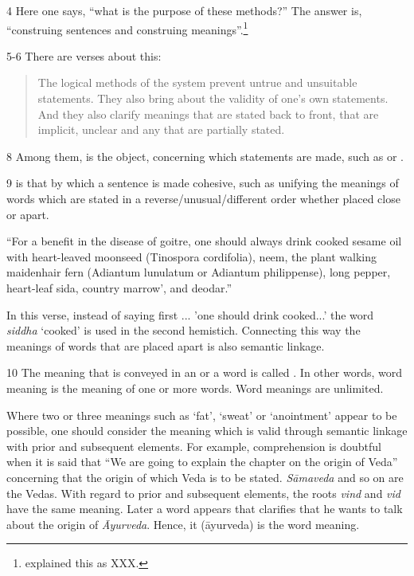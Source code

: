 \begin{translation}
\item [4] Here one says, “what is the purpose of these methods?” The
answer is, “construing sentences and construing
meanings”.\footnote{ explained this as XXX.}
    
    \item [5-6] There are  verses about this:
      
\begin{quote}
The logical methods of the system prevent untrue and unsuitable
statements. They also bring about the validity of one’s own
statements.  And they also clarify meanings that are stated back to
front, that are implicit, unclear and any that are partially stated.
\end{quote}    

    \item [8] Among them,  is the object, concerning which 
    statements are made, such as  or . 
    
    \item [9]  is that by which a sentence is made cohesive, such as unifying the meanings of words which are stated in a reverse/unusual/different order whether placed close or apart.
    
        ``For a benefit in the disease of goitre, one should always drink cooked sesame oil with heart-leaved moonseed (Tinospora cordifolia), neem, the plant walking maidenhair fern (Adiantum lunulatum or Adiantum philippense), long pepper, heart-leaf sida, country marrow', and deodar.'' 
    
    In this verse, instead of saying first ... 'one should drink cooked...' the word \emph{siddha} `cooked' is used in the second hemistich. Connecting this way the meanings of words that are placed apart is also semantic linkage.  
     
    
    \item [10] The meaning that is conveyed in an  or a word is called . In other words, word meaning is the meaning of one or more words. Word meanings are unlimited. 
    
   Where two or three meanings such as `fat’, `sweat’ or `anointment’ appear to be possible, one should consider the meaning which is valid through semantic linkage with prior and subsequent elements. For example, comprehension is doubtful when it is said that “We are going to explain the chapter on the origin of Veda” concerning that the origin of which Veda is to be stated. \emph{Sāmaveda} and so on are the Vedas. With regard to prior and subsequent elements, the roots \emph{vind} and \emph{vid} have the same meaning. Later a word appears that clarifies that he wants to talk about the origin of \emph{Āyurveda}. Hence, it (āyurveda) is the word meaning.  
    

\end{translation}
